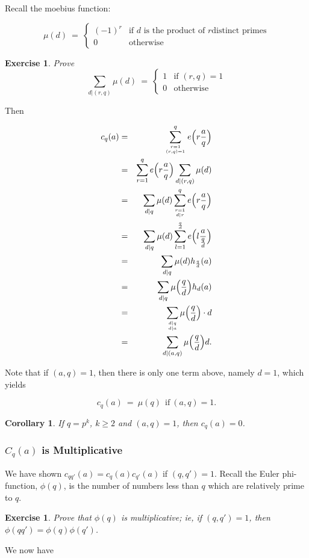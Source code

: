 \documentclass[12pt,letterpaper]{report}
\newcommand\be{\begin{equation}}
\newcommand\ee{\end{equation}}
\newcommand\bea{\begin{eqnarray}}
\newcommand\eea{\end{eqnarray}}
\newtheorem{cor}[thm]{Corollary}
\newtheorem{exe}[thm]{Exercise}
\newcommand{\twocase}[5]{#1 \begin{cases} #2 & \text{#3}\\ #4
&\text{#5} \end{cases}   }
\begin{document}
Recall the moebius function:

\be \twocase{\mu(d) \ = \ }{(-1)^r}{if $d$ is the product of $r$
distinct primes}{0}{otherwise} \ee

\begin{exe} Prove
\be \twocase{\sum_{d|(r,q)} \mu(d) \ = \ }{1}{if $(r,q) =
1$}{0}{otherwise} \ee
\end{exe}



Then

\bea c_q(a) &=& \sum_{r=1 \atop (r,q)=1}^q e\Big( r\frac{a}{q}
\Big) \nonumber\\ &=& \sum_{r=1}^q e\Big( r\frac{a}{q} \Big)
\sum_{d|(r,q)} \mu(d) \nonumber\\ &=& \sum_{d|q} \mu(d) \sum_{r=1
\atop d|r}^q e\Big( r\frac{a}{q} \Big) \nonumber\\ &=& \sum_{d|q}
\mu(d) \sum_{l = 1}^{\frac{q}{d}} e\Big( l\frac{a}{ \frac{q}{d}}
\Big) \nonumber\\ &=& \sum_{d|q} \mu(d) h_{\frac{q}{d}}(a)
\nonumber\\ &=& \sum_{d|q} \mu\Big( \frac{q}{d} \Big) h_d(a)
\nonumber\\ &=& \sum_{d|q \atop d|a} \mu\Big( \frac{q}{d} \Big)
\cdot d \nonumber\\ &=& \sum_{d|(a,q)} \mu\Big( \frac{q}{d}
\Big)d. \eea

Note that if $(a,q) = 1$, then there is only one term above,
namely $d = 1$, which yields

\be c_q(a) \ = \ \mu(q) \ \ \text{if} \ (a,q) = 1. \ee

\begin{cor} If $q = p^k$, $k \ge 2$ and $(a,q) = 1$, then $c_q(a)
= 0$. \end{cor}


\subsubsection{$C_q(a)$ is Multiplicative}

We have shown $c_{qq'}(a) = c_q(a)c_{q'}(a)$ if $(q,q') = 1$.
Recall the Euler phi-function, $\phi(q)$, is the number of numbers
less than $q$ which are relatively prime to $q$.

\begin{exe} Prove that $\phi(q)$ is multiplicative; ie, if
$(q,q')=1$, then $\phi(qq') = \phi(q)\phi(q')$. \end{exe}

We now have
\end{document}
